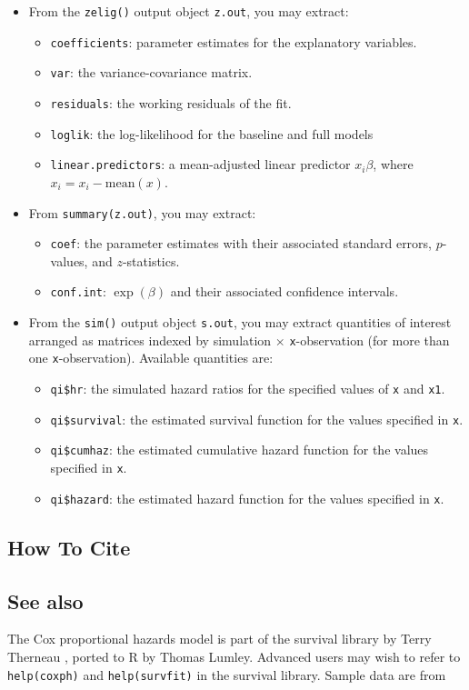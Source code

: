 \begin{itemize}
\item From the {\tt zelig()} output object {\tt z.out}, you may
  extract:
   \begin{itemize}
   \item {\tt coefficients}: parameter estimates for the explanatory
     variables.
   \item {\tt var}: the variance-covariance matrix.
   \item {\tt residuals}: the working residuals of the fit.
   \item {\tt loglik}: the log-likelihood for the baseline and full models
   \item {\tt linear.predictors}: a mean-adjusted linear predictor $x_i \beta$, where $x_i = x_i - \mathrm{mean}(x)$.
   \end{itemize}

\item From {\tt summary(z.out)}, you may extract:
   \begin{itemize}
   \item {\tt coef}: the parameter estimates with their
     associated standard errors, $p$-values, and $z$-statistics.
   \item {\tt conf.int}: $\exp(\beta)$ and their associated confidence intervals.
   \end{itemize}

\item From the {\tt sim()} output object {\tt s.out}, you may extract
  quantities of interest arranged as matrices indexed by simulation
  $\times$ {\tt x}-observation (for more than one {\tt x}-observation).
  Available quantities are:

   \begin{itemize}
   \item {\tt qi\$hr}: the simulated hazard ratios for the
     specified values of {\tt x} and {\tt x1}.
   \item {\tt qi\$survival}: the estimated survival function for the values specified in {\tt x}.
   \item {\tt qi\$cumhaz}: the estimated cumulative hazard function for the values specified in {\tt x}.
   \item {\tt qi\$hazard}: the estimated hazard function for the values specified in {\tt x}.
   \end{itemize}
\end{itemize}

\subsection*{How To Cite}

%


\subsection*{See also}

The Cox proportional hazards model is part of the survival library by Terry Therneau \citep{TheGra00}, ported to R by Thomas Lumley.  Advanced users may wish to refer to {\tt help(coxph)} and {\tt help(survfit)} in the survival library.  Sample data are from \citet{KinAltBur90}

